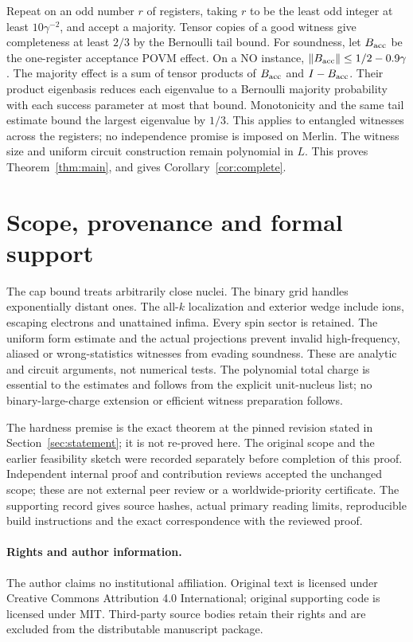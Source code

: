 \documentclass[11pt]{article}
\theoremstyle{remark}\newtheorem{remark}[theorem]{Remark}
\newcommand{\norm}[1]{\left\lVert#1\right\rVert}
\numberwithin{equation}{section}
\begin{document}
Repeat on an odd number $r$ of registers, taking $r$ to be the least odd
integer at least $10\gamma^{-2}$, and accept a majority. Tensor copies of
a good witness give completeness at least $2/3$ by the Bernoulli tail
bound. For soundness, let $B_{\rm acc}$ be the one-register acceptance
POVM effect. On a NO instance,
$\norm{B_{\rm acc}}\leq1/2-0.9\gamma$.
The majority effect is a sum of tensor products of $B_{\rm acc}$ and
$I-B_{\rm acc}$. Their product eigenbasis reduces each eigenvalue to a
Bernoulli majority probability with each success parameter at most that
bound. Monotonicity and the same tail estimate bound the largest eigenvalue
by $1/3$. This applies to entangled witnesses across the registers; no
independence promise is imposed on Merlin. The witness size and uniform
circuit construction remain polynomial in $L$. This proves
Theorem~\ref{thm:main}, and \cite[Theorem 1]{unit} gives
Corollary~\ref{cor:complete}.

\section{Scope, provenance and formal support}
\label{sec:scope}
The cap bound treats arbitrarily close nuclei. The binary grid handles
exponentially distant ones. The all-$k$ localization and exterior wedge
include ions, escaping electrons and unattained infima. Every spin sector
is retained. The uniform form estimate and the actual projections prevent
invalid high-frequency, aliased or wrong-statistics witnesses from evading
soundness. These are analytic and circuit arguments, not numerical tests.
The polynomial total charge is essential to the estimates and follows
from the explicit unit-nucleus list; no binary-large-charge extension or
efficient witness preparation follows.

The hardness premise is the exact theorem at the pinned revision stated
in Section~\ref{sec:statement}; it is not re-proved here. The original
scope and the earlier feasibility sketch were recorded separately before
completion of this proof. Independent internal proof and contribution
reviews accepted the unchanged scope; these are not external peer review
or a worldwide-priority certificate. The supporting record gives source
hashes, actual primary reading limits, reproducible build instructions and
the exact correspondence with the reviewed proof.



\paragraph{Rights and author information.}
The author claims no institutional affiliation. Original text is licensed
under Creative Commons Attribution 4.0 International; original supporting
code is licensed under MIT. Third-party source bodies retain their rights
and are excluded from the distributable manuscript package.
\end{document}
